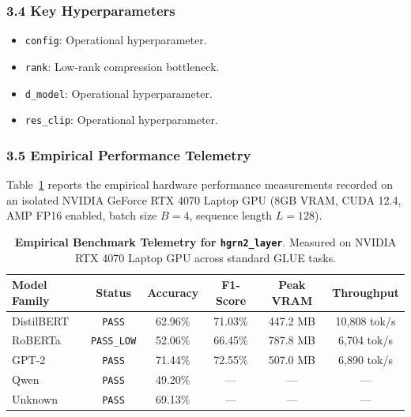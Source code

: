 \subsubsection*{3.4 Key Hyperparameters}
\begin{itemize}
    \item \texttt{config}: Operational hyperparameter.
    \item \texttt{rank}: Low-rank compression bottleneck.
    \item \texttt{d\_model}: Operational hyperparameter.
    \item \texttt{res\_clip}: Operational hyperparameter.
\end{itemize}

\subsubsection*{3.5 Empirical Performance Telemetry}
Table~\ref{tab:telemetry_hgrn2_layer} reports the empirical hardware performance measurements recorded on an isolated NVIDIA GeForce RTX 4070 Laptop GPU (8GB VRAM, CUDA 12.4, AMP FP16 enabled, batch size $B=4$, sequence length $L=128$).

\begin{table}[h]
\centering
\small
\caption{\textbf{Empirical Benchmark Telemetry for \texttt{hgrn2\_layer}}. Measured on NVIDIA RTX 4070 Laptop GPU across standard GLUE tasks.}
\label{tab:telemetry_hgrn2_layer}
\begin{tabular*}{\columnwidth}{@{\extracolsep{\fill}}lccccc}
\toprule
\textbf{Model Family} & \textbf{Status} & \textbf{Accuracy} & \textbf{F1-Score} & \textbf{Peak VRAM} & \textbf{Throughput} \\
\midrule
DistilBERT & \texttt{PASS} & 62.96\% & 71.03\% & 447.2 MB & 10,808 tok/s \\
RoBERTa & \texttt{PASS\_LOW} & 52.06\% & 66.45\% & 787.8 MB & 6,704 tok/s \\
GPT-2 & \texttt{PASS} & 71.44\% & 72.55\% & 507.0 MB & 6,890 tok/s \\
Qwen & \texttt{PASS} & 49.20\% & --- & --- & --- \\
Unknown & \texttt{PASS} & 69.13\% & --- & --- & --- \\
\bottomrule
\end{tabular*}
\end{table}

